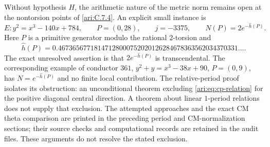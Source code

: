 Without hypothesis $H$, the arithmetic nature of the metric norm remains open at the
nontorsion points of \cref{ari:C.7.4}. An explicit small instance is
\[
 E:y^2=x^3-140x+784,\qquad P=(0,28),\qquad j=-3375,
 \qquad N(P)=2e^{-\widehat h(P)}.
\]
Here $P$ is a primitive generator modulo the rational
$2$-torsion and
\[
 \widehat h(P)=
 0.46736567718147128000752020126284678363562034370331\ldots.
\]
The exact unresolved assertion is that $2e^{-\widehat h(P)}$
is transcendental. The corresponding example of conductor
$361$, $y^2+y=x^3-38x+90$, $P=(0,9)$, has
$N=e^{-\widehat h(P)}$ and no finite local contribution.
The relative-period proof isolates its obstruction: an
unconditional theorem excluding
\eqref{ari:eq:cp-relation} for the positive diagonal central
direction. A theorem about linear $1$-period relations
does not supply that exclusion. The attempted approaches and the exact CM theta comparison are printed in the preceding period and CM-normalization sections;
their source checks and computational records are retained in the audit files.
These arguments do not resolve the stated exclusion.

\clearpage



\clearpage
